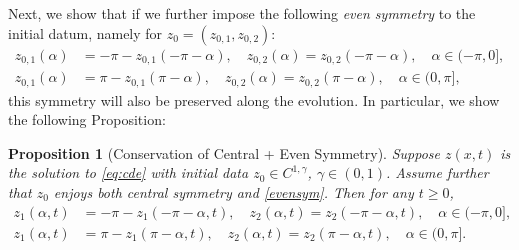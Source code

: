 \documentclass[11pt]{article}
\numberwithin{equation}{section}
\newtheorem{prop}[thm]{Proposition}
\begin{document}
Next, we show that if we further impose the following \textit{even symmetry} to the initial datum, namely for $z_0 = (z_{0,1}, z_{0,2})$:
\begin{equation}\label{evensym}
\begin{split}
    z_{0,1}(\alpha) &= -\pi - z_{0,1}(-\pi - \alpha),\quad z_{0,2}(\alpha) = z_{0,2}(-\pi - \alpha),\quad \alpha \in (-\pi,0],\\
    z_{0,1}(\alpha) &= \pi - z_{0,1}(\pi - \alpha),\quad z_{0,2}(\alpha) = z_{0,2}(\pi - \alpha),\quad \alpha \in (0,\pi],
\end{split}
\end{equation}
this symmetry will also be preserved along the evolution. In particular, we show the following Proposition:
\begin{prop}[Conservation of Central + Even Symmetry]
    \label{prop:even}
    Suppose $z(x,t)$ is the solution to \eqref{eq:cde} with initial data $z_0 \in C^{1,\gamma}$, $\gamma \in (0,1)$. Assume further that $z_0$ enjoys both central symmetry and \eqref{evensym}. Then for any $t \ge 0$,
\begin{equation}\label{evensym1}
\begin{split}
    z_{1}(\alpha,t) &= -\pi - z_{1}(-\pi - \alpha,t),\quad z_{2}(\alpha,t) = z_{2}(-\pi - \alpha,t),\quad \alpha \in (-\pi,0],\\
    z_{1}(\alpha,t) &= \pi - z_{1}(\pi - \alpha,t),\quad z_{2}(\alpha,t) = z_{2}(\pi - \alpha,t),\quad \alpha \in (0,\pi].
\end{split}
\end{equation}
\end{prop}
\end{document}
